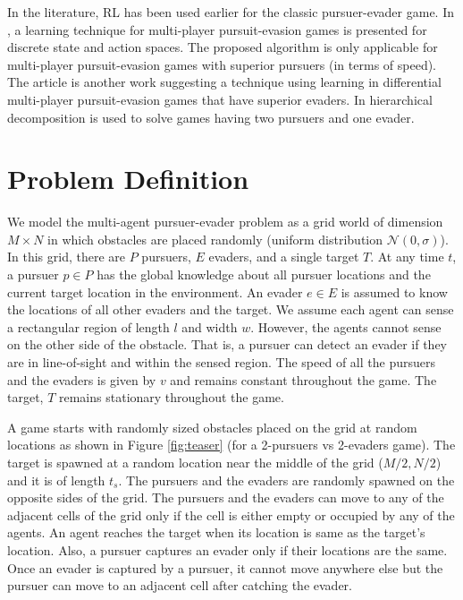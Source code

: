 \documentclass[conference]{IEEEtran}
\begin{document}
 In the literature, RL has been used earlier for the classic pursuer-evader game\cite{isaacs1999differential}. In \cite{liu2010novel}, a learning technique for multi-player pursuit-evasion games is presented for discrete state and action spaces. The proposed algorithm is only applicable for multi-player pursuit-evasion games with superior pursuers (in terms of speed). The article \cite{wang2015research} is another work suggesting a technique using learning in differential multi-player pursuit-evasion games that have superior evaders. In \cite{alexopoulos2015iros} hierarchical decomposition is used to solve games having two pursuers and one evader.

\section{Problem Definition}
\label{sec:probdef}



We model the multi-agent pursuer-evader problem as a grid world of dimension $M \times N$ in which obstacles are placed randomly (uniform distribution $\mathcal{N}(0,\sigma)$). In this grid, there are $P$ pursuers, $E$ evaders, and a single target $T$. At any time $t$, a pursuer $p\in P$ has the global knowledge about all pursuer locations and the current target location in the environment. An evader $e\in E$ is assumed to know the locations of all other evaders and the target. We assume each agent can sense a rectangular region of length $l$ and width $w$. However, the agents cannot sense on the other side of the obstacle. That is, a pursuer can detect an evader if they are in line-of-sight and within the sensed region. %
The speed of all the pursuers and the evaders is given by $v$ and remains constant throughout the game. The target, $T$ remains stationary throughout the game.

A game starts with randomly sized obstacles placed on the grid at random locations as shown in  Figure \ref{fig:teaser} (for a 2-pursuers vs 2-evaders game). The target is spawned at a random location near the middle of the grid ($M/2,N/2$) and it is of length $t_s$. The pursuers and the evaders are randomly spawned on the opposite sides of the grid. %
The pursuers and the evaders can move to any of the adjacent cells of the grid only if the cell is either empty or occupied by any of the agents. An agent reaches the target when its location is same as the target's location. Also, a pursuer captures an evader only if their locations are the same. Once an evader is captured by a pursuer, it cannot move anywhere else but the pursuer can move to an adjacent cell after catching the evader.
\end{document}
